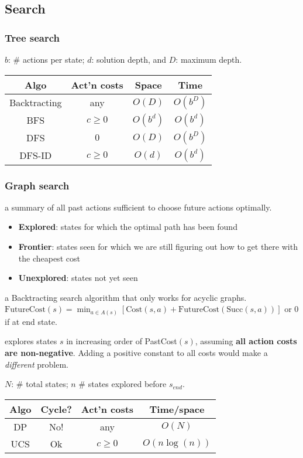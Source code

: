 \subsection{Search}

\subsubsection{Tree search}

 $b$: \# actions per state; $d$: solution depth, and $D$:
maximum depth.
\begin{tabular}{|c|c|c|c|} 
    \hline
    \textbf{Algo}  & \textbf{Act'n costs} & \textbf{Space} & \textbf{Time} \\
    \hline
    Backtracting & any & $O(D)$ & $O(b^D)$ \\ 
    \hline
    BFS & $c \ge 0$ & $O(b^d)$ & $O(b^d)$ \\
    \hline
    DFS & $0$ & $O(D)$ & $O(b^D)$ \\
    \hline
    DFS-ID & $c \ge 0$ & $O(d)$ & $O(b^d)$ \\
    \hline
\end{tabular}

\subsubsection{Graph search}

 a summary of all past actions sufficient to choose future actions optimally.

\begin{itemize}
    \item \textbf{Explored}: states for which the optimal path has been found
    \item \textbf{Frontier}: states seen for which we are still figuring out how to get there with the cheapest cost
    \item \textbf{Unexplored}: states not yet seen
\end{itemize}

 a Backtracting search algorithm that only works
for acyclic graphs.
$\text{FutureCost}(s) = \min_{a\in A(s)}\left[\text{Cost}(s,a) + \text{FutureCost}(\text{Succ}(s,a))\right]$
or $0$ if at end state.

 explores states $s$ in increasing order of
PastCost$(s)$, assuming \textbf{all action costs are non-negative}. Adding a
positive constant to all costs would make a \emph{different} problem.

 $N$: \# total states; $n$ \# states explored before $s_{end}$.

\begin{tabular}{|c|c|c|c|} 
    \hline
    \textbf{Algo} & \textbf{Cycle?} & \textbf{Act'n costs} & \textbf{Time/space} \\
    \hline
    DP & No! & any & $O(N)$ \\ 
    \hline
    UCS & Ok & $c \ge 0$ & $O(n \log(n))$ \\
    \hline
\end{tabular}